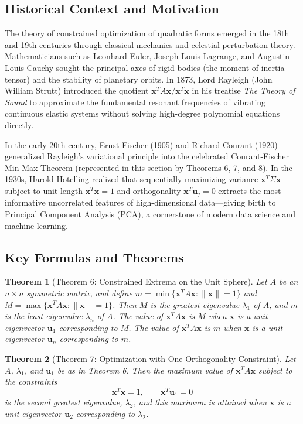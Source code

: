 \documentclass[11pt, letterpaper]{article}
\newtheorem{theorem}{Theorem}[section]
\theoremstyle{definition}
\theoremstyle{remark}
\begin{document}
\subsection{Historical Context and Motivation}
The theory of constrained optimization of quadratic forms emerged in the 18th and 19th centuries through classical mechanics and celestial perturbation theory. Mathematicians such as Leonhard Euler, Joseph-Louis Lagrange, and Augustin-Louis Cauchy sought the principal axes of rigid bodies (the moment of inertia tensor) and the stability of planetary orbits. In 1873, Lord Rayleigh (John William Strutt) introduced the quotient $\mathbf{x}^T A \mathbf{x} / \mathbf{x}^T \mathbf{x}$ in his treatise \emph{The Theory of Sound} to approximate the fundamental resonant frequencies of vibrating continuous elastic systems without solving high-degree polynomial equations directly.

In the early 20th century, Ernst Fischer (1905) and Richard Courant (1920) generalized Rayleigh's variational principle into the celebrated Courant-Fischer Min-Max Theorem (represented in this section by Theorems 6, 7, and 8). In the 1930s, Harold Hotelling realized that sequentially maximizing variance $\mathbf{x}^T \Sigma \mathbf{x}$ subject to unit length $\mathbf{x}^T\mathbf{x} = 1$ and orthogonality $\mathbf{x}^T \mathbf{u}_j = 0$ extracts the most informative uncorrelated features of high-dimensional data—giving birth to Principal Component Analysis (PCA), a cornerstone of modern data science and machine learning.

\subsection{Key Formulas and Theorems}
\begin{theorem}[Theorem 6: Constrained Extrema on the Unit Sphere]
Let $A$ be an $n \times n$ symmetric matrix, and define $m = \min\{\mathbf{x}^T A \mathbf{x} : \|\mathbf{x}\| = 1\}$ and $M = \max\{\mathbf{x}^T A \mathbf{x} : \|\mathbf{x}\| = 1\}$. Then $M$ is the greatest eigenvalue $\lambda_1$ of $A$, and $m$ is the least eigenvalue $\lambda_n$ of $A$. The value of $\mathbf{x}^T A \mathbf{x}$ is $M$ when $\mathbf{x}$ is a unit eigenvector $\mathbf{u}_1$ corresponding to $M$. The value of $\mathbf{x}^T A \mathbf{x}$ is $m$ when $\mathbf{x}$ is a unit eigenvector $\mathbf{u}_n$ corresponding to $m$.
\end{theorem}

\begin{theorem}[Theorem 7: Optimization with One Orthogonality Constraint]
Let $A$, $\lambda_1$, and $\mathbf{u}_1$ be as in Theorem 6. Then the maximum value of $\mathbf{x}^T A \mathbf{x}$ subject to the constraints
\[
\mathbf{x}^T \mathbf{x} = 1, \qquad \mathbf{x}^T \mathbf{u}_1 = 0
\]
is the second greatest eigenvalue, $\lambda_2$, and this maximum is attained when $\mathbf{x}$ is a unit eigenvector $\mathbf{u}_2$ corresponding to $\lambda_2$.
\end{theorem}
\end{document}
